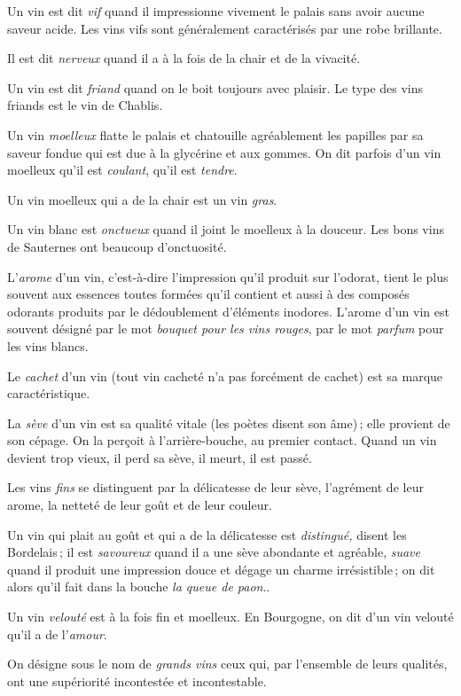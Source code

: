 Un vin est dit \textit{vif} quand il impressionne vivement le palais sans avoir
aucune saveur acide. Les vins vifs sont généralement caractérisés par une robe
brillante.

Il est dit \textit{nerveux} quand il a à la fois de la chair et de la vivacité.

Un vin est dit \textit{friand} quand on le boit toujours avec plaisir. Le type
des vins friands est le vin de Chablis.

Un vin \textit{moelleux} flatte le palais et chatouille agréablement les
papilles par sa saveur fondue qui est due à la glycérine et aux gommes. On dit
parfois d'un vin moelleux qu'il est \textit{coulant}, qu'il est
\textit{tendre}.

Un vin moelleux qui a de la chair est un vin \textit{gras}.

Un vin blanc est \textit{onctueux} quand il joint le moelleux à la douceur. Les
bons vins de Sauternes ont beaucoup d'onctuosité.

L'\textit{arome} d'un vin, c'est-à-dire l'impression qu'il produit sur
l'odorat, tient le plus souvent aux essences toutes formées qu'il contient et
aussi à des composés odorants produits par le dédoublement d'éléments inodores.
L'arome d’un vin est souvent désigné par le mot \textit{bouquet pour les vins
rouges}, par le mot \textit{parfum} pour les vins blancs.

Le \textit{cachet} d'un vin (tout vin cacheté n'a pas forcément de cachet) est
sa marque caractéristique.

La \textit{sève} d'un vin est sa qualité vitale (les poètes disent son âme) ;
elle provient de son cépage. On la perçoit à l'arrière-bouche, au premier
contact. Quand un vin devient trop vieux, il perd sa sève, il meurt, il est
passé.

Les vins \textit{fins} se distinguent par la délicatesse de leur sève,
l'agrément de leur arome, la netteté de leur goût et de leur couleur.

Un vin qui plait au goût et qui a de la délicatesse est \textit{distingué,}
disent les Bordelais ; il est \textit{savoureux} quand il a une sève abondante
et agréable, \textit{suave} quand il produit une impression douce et dégage un
charme irrésistible ; on dit alors qu'il fait dans la bouche \textit{la queue
de paon}..

Un vin \textit{velouté} est à la fois fin et moelleux. En Bourgogne, on dit
d'un vin velouté qu'il a de l'\textit{amour}.

On désigne sous le nom de \textit{grands vins} ceux qui, par l’ensemble de
leurs qualités, ont une supériorité incontestée et incontestable.

